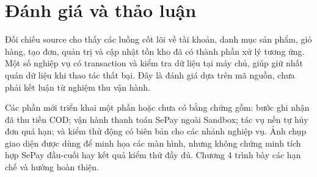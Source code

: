 \section{Đánh giá và thảo luận}
Đối chiếu source cho thấy các luồng cốt lõi về tài khoản, danh mục sản phẩm, giỏ hàng, tạo đơn, quản trị và cập nhật tồn kho đã có thành phần xử lý tương ứng. Một số nghiệp vụ có transaction và kiểm tra dữ liệu tại máy chủ, giúp giữ nhất quán dữ liệu khi thao tác thất bại. Đây là đánh giá dựa trên mã nguồn, chưa phải kết luận từ nghiệm thu vận hành.

Các phần mới triển khai một phần hoặc chưa có bằng chứng gồm: bước ghi nhận đã thu tiền COD; vận hành thanh toán SePay ngoài Sandbox; tác vụ nền tự hủy đơn quá hạn; và kiểm thử động có biên bản cho các nhánh nghiệp vụ. Ảnh chụp giao diện được dùng để minh họa các màn hình, nhưng không chứng minh tích hợp SePay đầu-cuối hay kết quả kiểm thử đầy đủ. Chương 4 trình bày các hạn chế và hướng hoàn thiện.
